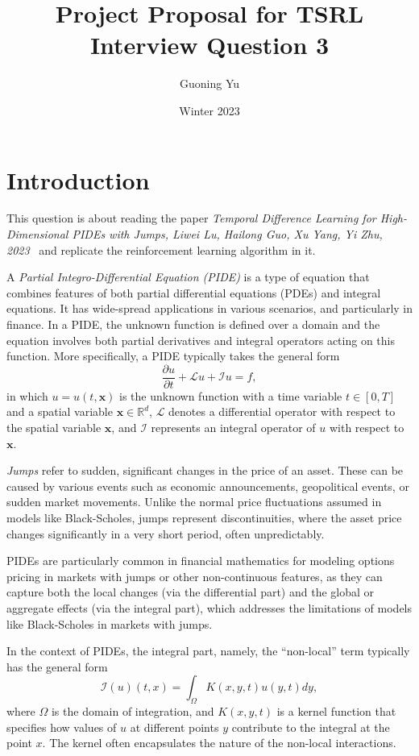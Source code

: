 \documentclass[12pt,letterpaper,oneside]{article}
\title{Project Proposal for TSRL Interview Question 3}
\author{Guoning Yu}
\date{Winter 2023}
\begin{document}
	
\baselineskip 0.6cm
\maketitle

\section{Introduction}
	This question is about reading the paper \textit{Temporal Difference Learning for High-Dimensional PIDEs with Jumps, Liwei Lu, Hailong Guo, Xu Yang, Yi Zhu, 2023}~\cite{lu2023temporal} and replicate the reinforcement learning algorithm in it. 
	
	A \textit{Partial Integro-Differential Equation (PIDE)} is a type of equation that combines features of both partial differential equations (PDEs) and integral equations. It has wide-spread applications in various scenarios, and particularly in finance. In a PIDE, the unknown function is defined over a domain and the equation involves both partial derivatives and integral operators acting on this function. More specifically, a PIDE typically takes the  general form
	\begin{equation}
		\frac{\partial u}{\partial t}+\mathcal{L} u+\mathcal{I} u=f,
	\end{equation}
	in which $u = u(t, \textbf{x})$ is the unknown function with a time variable $ t \in [0, T] $ and a spatial variable $ \textbf{x}\in \mathbb{R}^d $, $\mathcal{L}$ denotes a differential operator with respect to the spatial variable $ \textbf{x}$, and $\mathcal{I}$ represents an integral operator of $u$ with respect to $ \textbf{x} $.
	
	\textit{Jumps} refer to sudden, significant changes in the price of an asset. These can be caused by various events such as economic announcements, geopolitical events, or sudden market movements. Unlike the normal price fluctuations assumed in models like Black-Scholes, jumps represent discontinuities, where the asset price changes significantly in a very short period, often unpredictably. 
		
	PIDEs are particularly common in financial mathematics for modeling options pricing in markets with jumps or other non-continuous features, as they can capture both the local changes (via the differential part) and the global or aggregate effects (via the integral part), which addresses the limitations of models like Black-Scholes in markets with jumps.
	
	In the context of PIDEs, the integral part, namely, the ``non-local'' term typically has the general form
	$$
	\mathcal{I}(u)(t, x)=\int_{\Omega} K(x, y, t) u(y, t) d y,
	$$
	where $\Omega$ is the domain of integration, and $K(x, y, t)$ is a kernel function that specifies how values of $u$ at different points $y$ contribute to the integral at the point $x$. The kernel often encapsulates the nature of the non-local interactions.
	
\end{document}

